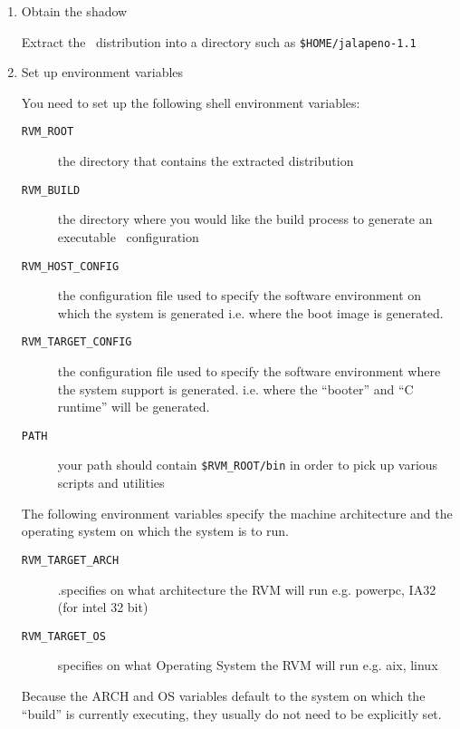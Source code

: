 \begin{enumerate}
\item Obtain the shadow

Extract the \jp\ distribution into
a directory such as {\tt \$HOME/jalapeno-1.1}

\item Set up environment variables

You need to set up the following shell environment variables:

\begin{description}
\item [{\tt RVM\_ROOT}] the directory that contains the extracted
distribution 
\item [{\tt RVM\_BUILD}] the directory where you would like the build
process to generate an executable \jp\ configuration

\item [{\tt RVM\_HOST\_CONFIG}] the configuration file used to specify
the software environment on which the system is generated i.e. where the
boot image is generated.

\item [{\tt RVM\_TARGET\_CONFIG}] the configuration file used to specify
the software environment where the system support is generated. i.e. where
the ``booter'' and ``C runtime'' will be generated.

\item[{\tt PATH}] your path should contain {\tt \$RVM\_ROOT/bin} in
order to pick up various scripts and utilities
\end{description}

The following environment variables specify the machine architecture and
the operating system on which the system is to run.
\begin{description}

\item [{\tt RVM\_TARGET\_ARCH}].specifies on what architecture
the RVM will run e.g.  powerpc, IA32 (for intel 32 bit)

\item [{\tt RVM\_TARGET\_OS}] specifies on what Operating System
the RVM will run e.g. aix, linux

\end{description}

Because the ARCH and OS  variables default to the system on which the ``build'' is
currently executing, they usually do not need to be 
explicitly set.



\end{enumerate}

